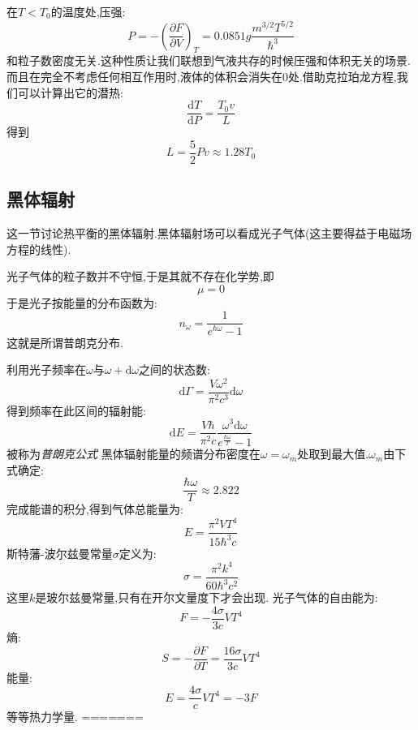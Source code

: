     在$T<T_0$的温度处,压强:
    \[P=-\left( \dfrac{\partial F}{\partial V} \right) _T=0.0851g\frac{m^{3 /2}T^{5/2}}{\hbar^{3}}\]
    和粒子数密度无关.这种性质让我们联想到气液共存的时候压强和体积无关的场景.而且在完全不考虑任何相互作用时,液体的体积会消失在0处.借助克拉珀龙方程,我们可以计算出它的潜热:
    \[\dfrac{\mathrm{d}T}{\mathrm{d} P}=\frac{T_0v}{L}\]
    得到 
    \[L=\frac{5}{2}Pv\approx 1.28T_0\]

\subsection{黑体辐射}
    这一节讨论热平衡的黑体辐射.黑体辐射场可以看成光子气体(这主要得益于电磁场方程的线性).

    光子气体的粒子数并不守恒,于是其就不存在化学势,即 
    \[\mu=0\]
    于是光子按能量的分布函数为:
    \begin{equation}
      n_\omega=\frac{1}{e^{\hbar \omega}-1}
    \end{equation}
    这就是所谓普朗克分布.

    利用光子频率在$\omega$与$\omega +\mathrm{d}  \omega$之间的状态数:
    \[\mathrm{d} \Gamma=\frac{V\omega^{2}}{\pi^{2}c^{3}}\mathrm{d} \omega\]
    得到频率在此区间的辐射能:
    \begin{equation}
      \mathrm{d} E=\frac{V\hbar}{\pi^{2}c}\frac{\omega^{3}\mathrm{d} \omega}{e^{\frac{\hbar\omega}{T}}-1}
    \end{equation}
    被称为\emph{普朗克公式}
    黑体辐射能量的频谱分布密度在$\omega=\omega_m$处取到最大值.$\omega_m$由下式确定:
    \[\frac{\hbar \omega}{T}\approx 2.822\]
    完成能谱的积分,得到气体总能量为:
    \begin{equation}
      E=\frac{\pi^{2}VT^{4}}{15\hbar^{3}c}
    \end{equation}
    斯特藩-波尔兹曼常量$\sigma$定义为:
    \[\sigma=\frac{\pi^{2}k^{4}}{60\hbar^{3}c^{2}}\]
    这里$k$是玻尔兹曼常量,只有在开尔文量度下才会出现.
    光子气体的自由能为:
    \begin{equation}
      F=-\frac{4\sigma}{3c}VT^{4}
    \end{equation}
    熵:
    \begin{equation}
      S=-\dfrac{\partial F}{\partial T}=\frac{16\sigma}{3c}VT^{4}
    \end{equation}
    能量:
    \begin{equation}
      E=\frac{4\sigma}{c}VT^{4}=-3F
    \end{equation}
    等等热力学量.
=======

